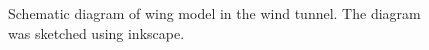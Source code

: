 \documentclass[11pt,a4]{article}
\begin{document}
\begin{figure}[htb]
  \centering
{}
\caption{Schematic diagram of wing model in the wind tunnel. The diagram was sketched using inkscape.}
\label{wingtunnel}
\end{figure}
\end{document}
